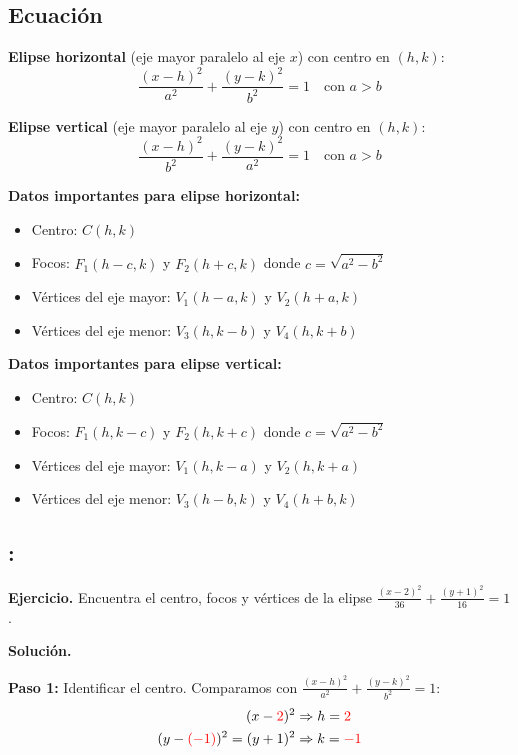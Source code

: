 \documentclass[12pt,a4paper]{article}
\begin{document}
	\subsection*{Ecuación}

	\textbf{Elipse horizontal} (eje mayor paralelo al eje $x$) con centro en $(h,k)$:
	\[
	\boxed{\frac{(x-h)^2}{a^2}+\frac{(y-k)^2}{b^2}=1} \quad\text{con }a>b
	\]

	\textbf{Elipse vertical} (eje mayor paralelo al eje $y$) con centro en $(h,k)$:
	\[
	\boxed{\frac{(x-h)^2}{b^2}+\frac{(y-k)^2}{a^2}=1} \quad\text{con }a>b
	\]

	\textbf{Datos importantes para elipse horizontal:}
	\begin{itemize}
		\item Centro: $C(h,k)$
		\item Focos: $F_1(h-c,k)$ y $F_2(h+c,k)$ donde $c=\sqrt{a^2-b^2}$
		\item Vértices del eje mayor: $V_1(h-a,k)$ y $V_2(h+a,k)$
		\item Vértices del eje menor: $V_3(h,k-b)$ y $V_4(h,k+b)$
	\end{itemize}

	\textbf{Datos importantes para elipse vertical:}
	\begin{itemize}
		\item Centro: $C(h,k)$
		\item Focos: $F_1(h,k-c)$ y $F_2(h,k+c)$ donde $c=\sqrt{a^2-b^2}$
		\item Vértices del eje mayor: $V_1(h,k-a)$ y $V_2(h,k+a)$
		\item Vértices del eje menor: $V_3(h-b,k)$ y $V_4(h+b,k)$
	\end{itemize}

	\subsection*{{\color{blue!40!red}{Ejemplo 3}}: \color{blue!80!black}{Elipse horizontal con centro fuera del origen}}

	\textbf{Ejercicio.} Encuentra el centro, focos y vértices de la elipse $\displaystyle\frac{(x-2)^2}{36}+\frac{(y+1)^2}{16}=1$.

	\bigskip

	\textbf{Solución.}

	\bigskip

	\textbf{Paso 1:} Identificar el centro. Comparamos con $\displaystyle\frac{(x-h)^2}{a^2}+\frac{(y-k)^2}{b^2}=1$:
	\[
	\begin{aligned}
		(x-{\color{red}{2}})^2&\Rightarrow h={\color{red}{2}}\\
		(y-{\color{red}{(-1)}})^2=(y+1)^2&\Rightarrow k={\color{red}{-1}}
	\end{aligned}
	\]
\end{document}
